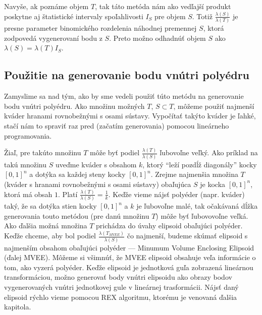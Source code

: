 Navyše, ak poznáme objem $T$, tak táto metóda nám ako vedľajší produkt poskytne aj štatistické intervaly spoľahlivosti $I_S$ pre objem $S$. Totiž $\frac{\lambda(S)}{\lambda(T)}$ je presne parameter binomického rozdelenia náhodnej premennej $S$, ktorá zodpovedá vygenerovaní bodu z $S$. Preto možno odhadnúť objem $S$ ako $\lambda(S)=\lambda(T)I_S$.

\subsection{Použitie na generovanie bodu vnútri polyédru}

Zamyslime sa nad tým, ako by sme vedeli použiť túto metódu na generovanie bodu vnútri polyédru. Ako množinu možných $T$, $S \subset T$, môžeme použiť najmenší kváder hranami rovnobežnými s osami sústavy. Vypočítať takýto kváder je ľahké, stačí nám to spraviť raz pred (začatím generovania) pomocou lineárneho programovania.

Žiaľ, pre takúto množinu $T$ môže byť podiel $\frac{\lambda(T)}{\lambda(S)}$ ľubovoľne veľký. Ako príklad na takú množinu $S$ uveďme kváder s obsahom $k$, ktorý ``leží pozdĺž diagonály'' kocky $[0,1]^n$ a dotýka sa každej steny kocky $[0,1]^n$. Zrejme najmenšia množina $T$ (kváder s hranami rovnobežnými s osami sústavy) obaľujúca $S$ je kocka $[0,1]^n$, ktorá má obsah $1$. Platí $\frac{\lambda(T)}{\lambda(S)}=\frac{1}{k}$. Keďže vieme nájsť polyéder (napr. kváder) taký, že sa dotýka stien kocky $[0,1]^n$ a $k$ je ľubovoľne malé, tak očakávaná dĺžka generovania touto metódou (pre danú množinu $T$) môže byť ľubovovoľne veľká.\\

Ako ďalšia možná množina $T$ prichádza do úvahy elipsoid obaľujúci polyéder. Keďže chceme, aby bol podiel $\frac{\lambda(T_{MVEE})}{\lambda(S)}$ čo najmenší, budeme skúmať elipsoid s najmenším obsahom obaľujúci polyéder --- Minumum Volume Enclosing Elipsoid (ďalej MVEE). Môžeme si všimnúť, že MVEE elipsoid obsahuje veľa informácie o tom, ako vyzerá polyéder. Keďže elipsoid je jednotková guľa zobrazená lineárnou transformáciou, možno generovať body vnútri elipsoidu ako obrazy bodov vygenerovaných vnútri jednotkovej gule v lineárnej trasformácii. Nájsť daný elipsoid rýchlo vieme pomocou REX algoritmu, ktorému je venovaná ďalšia kapitola.

